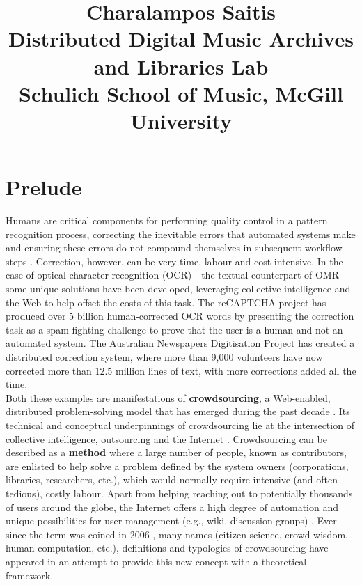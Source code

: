 \documentclass[letterpaper,10pt,pagesize=pdftex,headings=normal]{scrreprt}
\title{
	\raggedright\Large \textbf{Charalampos Saitis} \\ 
	\normalfont\sffamily\normalsize Distributed Digital Music Archives and Libraries Lab \\
	Schulich School of Music, McGill University
	}
\author{}
\date{}
\begin{document}
\maketitle
\tableofcontents

\chapter{Prelude}

Humans are critical components for performing quality control in a pattern recognition process, correcting the inevitable errors that automated systems make and ensuring these errors do not compound themselves in subsequent workflow steps \citep{hankinson2012b,burlet2012}. Correction, however, can be very time, labour and cost intensive. In the case of optical character recognition (OCR)---the textual counterpart of OMR---some unique solutions have been developed, leveraging collective intelligence and the Web to help offset the costs of this task. The reCAPTCHA project \citep{ahn2008} has produced over 5 billion human-corrected OCR words by presenting the correction task as a spam-fighting challenge to prove that the user is a human and not an automated system. The Australian Newspapers Digitisation Project \citep{holley2009} has created a distributed correction system, where more than 9,000 volunteers have now corrected more than 12.5 million lines of text, with more corrections added all the time.\\

\noindent Both these examples are manifestations of \textbf{crowdsourcing}, a Web-enabled, distributed problem-solving model that has emerged during the past decade \citep{brabham2013}. Its technical and conceptual underpinnings of crowdsourcing lie at the intersection of collective intelligence, outsourcing and the Internet \citep{brabham2013,saxton2013}. Crowdsourcing can be described as a \textbf{method} where a large number of people, known as contributors, are enlisted to help solve a problem defined by the system owners (corporations, libraries, researchers, etc.), which would normally require intensive (and often tedious), costly labour. Apart from helping reaching out to potentially thousands of users around the globe, the Internet offers a high degree of automation and unique possibilities for user management (e.g., wiki, discussion groups) \citep{doan2011}. Ever since the term was coined in 2006 \citep{howe2006}, many names (citizen science, crowd wisdom, human computation, etc.), definitions \citep{arolas2012} and typologies \citep{geiger2011} of crowdsourcing have appeared in an attempt to provide this new concept with a theoretical framework.\\
\end{document}
